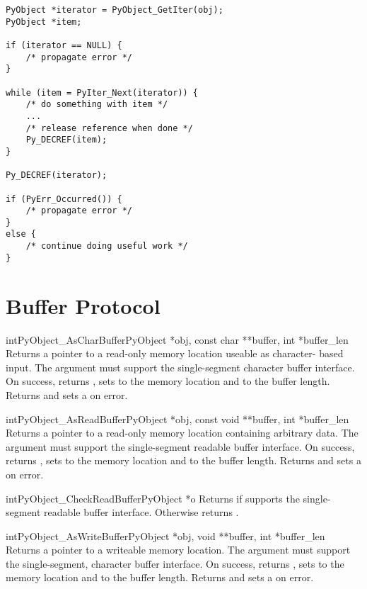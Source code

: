 \begin{verbatim}
PyObject *iterator = PyObject_GetIter(obj);
PyObject *item;

if (iterator == NULL) {
    /* propagate error */
}

while (item = PyIter_Next(iterator)) {
    /* do something with item */
    ...
    /* release reference when done */
    Py_DECREF(item);
}

Py_DECREF(iterator);

if (PyErr_Occurred()) {
    /* propagate error */
}
else {
    /* continue doing useful work */
}
\end{verbatim}


\section{Buffer Protocol \label{abstract-buffer}}

\begin{cfuncdesc}{int}{PyObject_AsCharBuffer}{PyObject *obj,
                                              const char **buffer,
                                              int *buffer_len}
  Returns a pointer to a read-only memory location useable as character-
  based input.  The  argument must support the single-segment
  character buffer interface.  On success, returns , sets
   to the memory location and  to the buffer
  length.  Returns  and sets a  on error.
\end{cfuncdesc}

\begin{cfuncdesc}{int}{PyObject_AsReadBuffer}{PyObject *obj,
                                              const void **buffer,
                                              int *buffer_len}
  Returns a pointer to a read-only memory location containing
  arbitrary data.  The  argument must support the
  single-segment readable buffer interface.  On success, returns
  , sets  to the memory location and 
  to the buffer length.  Returns  and sets a
   on error.
\end{cfuncdesc}

\begin{cfuncdesc}{int}{PyObject_CheckReadBuffer}{PyObject *o}
  Returns  if  supports the single-segment readable
  buffer interface.  Otherwise returns .
\end{cfuncdesc}

\begin{cfuncdesc}{int}{PyObject_AsWriteBuffer}{PyObject *obj,
                                               void **buffer,
                                               int *buffer_len}
  Returns a pointer to a writeable memory location.  The 
  argument must support the single-segment, character buffer
  interface.  On success, returns , sets  to the
  memory location and  to the buffer length.  Returns
   and sets a  on error.
\end{cfuncdesc}
